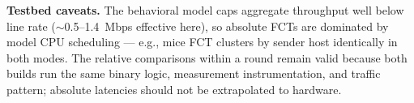 \textbf{Testbed caveats.} The behavioral model caps aggregate throughput
well below line rate ($\sim$0.5--1.4~Mbps effective here), so absolute
FCTs are dominated by model CPU scheduling --- e.g., mice FCT clusters by
sender host identically in both modes. The relative comparisons within a
round remain valid because both builds run the same binary logic,
measurement instrumentation, and traffic pattern; absolute latencies
should not be extrapolated to hardware.
